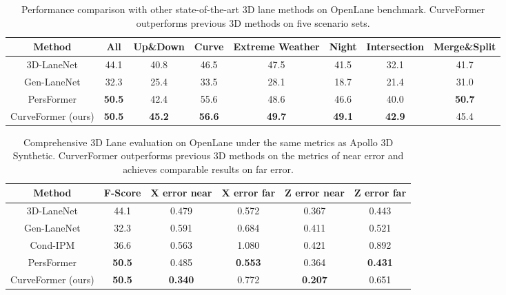 \documentclass[letterpaper, 10 pt, conference]{ieeeconf}
\begin{document}
\begin{table*}[t]
  \begin{center}
  \begin{scriptsize}
    \caption{Performance comparison with other state-of-the-art 3D lane methods on OpenLane benchmark. CurveFormer outperforms previous 3D methods on five scenario sets.}
    \label{tab:results-openlane-scenario-set}
    \begin{tabular}{cccccccc}
    \toprule
      Method & All & Up\&Down & Curve & Extreme Weather & Night & Intersection & Merge\&Split \\
      \midrule
      3D-LaneNet\cite{garnett20193d} & 44.1 & 40.8 & 46.5 & 47.5 & 41.5 & 32.1 & 41.7 \\
      Gen-LaneNet\cite{guo2020gen} & 32.3 & 25.4 & 33.5 & 28.1 & 18.7 & 21.4 & 31.0 \\
      PersFormer\cite{chen2022persformer} & \textbf{50.5} & 42.4 & 55.6 & 48.6 & 46.6 & 40.0 & \textbf{50.7} \\
      CurveFormer (ours) & \textbf{50.5} & \textbf{45.2} & \textbf{56.6} & \textbf{49.7} & \textbf{49.1} & \textbf{42.9} & 45.4\\
      \bottomrule
    \end{tabular}
      \end{scriptsize}
  \end{center}
\end{table*}

\begin{table}[t]
  \begin{center}
    \caption{Comprehensive 3D Lane evaluation on OpenLane under the same metrics as Apollo 3D Synthetic. CurverFormer outperforms previous 3D methods on the metrics of near error and achieves comparable results on far error.}
    \label{tab:results-openlane-val-set}
    \begin{tiny} 
    \begin{tabular}{cccccc}
    \toprule
      Method & F-Score & X error near & X error far & Z error near & Z error far \\
      \midrule
      3D-LaneNet\cite{garnett20193d} & 44.1 & 0.479 & 0.572 & 0.367 & 0.443 \\
      Gen-LaneNet\cite{guo2020gen} & 32.3 & 0.591 & 0.684 & 0.411 & 0.521 \\
      Cond-IPM & 36.6 & 0.563 & 1.080 & 0.421 & 0.892 \\
      PersFormer\cite{chen2022persformer} & \textbf{50.5} & 0.485 &  \textbf{0.553} & 0.364 &  \textbf{0.431} \\
      CurveFormer (ours) & \textbf{50.5} & \textbf{0.340} & 0.772 &  \textbf{0.207} & 0.651 \\
      \bottomrule
    \end{tabular}
    \end{tiny} 
  \end{center}
\end{table}
\end{document}
